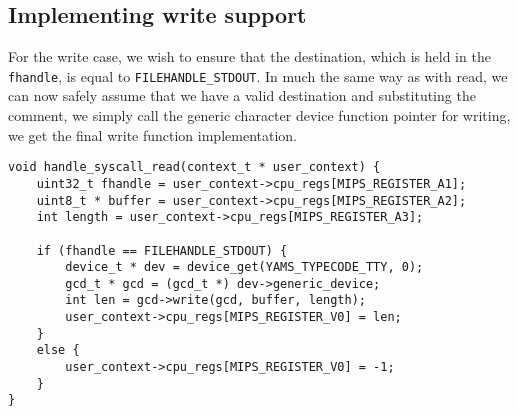 \documentclass[11pt]{article}
\newcommand{\code}[1]{{\tt #1}}
\begin{document}
\subsection{Implementing write support}
For the write case, we wish to ensure that the destination, which is held in
the \code{fhandle}, is equal to \code{FILEHANDLE\_STDOUT}. In much the same
way as with read, we can now safely assume that we have a valid destination
and substituting the comment, we simply call the generic character device
function pointer for writing, we get the final write function implementation.

\begin{lstlisting}
void handle_syscall_read(context_t * user_context) {
    uint32_t fhandle = user_context->cpu_regs[MIPS_REGISTER_A1];
    uint8_t * buffer = user_context->cpu_regs[MIPS_REGISTER_A2];
    int length = user_context->cpu_regs[MIPS_REGISTER_A3];

    if (fhandle == FILEHANDLE_STDOUT) {
        device_t * dev = device_get(YAMS_TYPECODE_TTY, 0);
        gcd_t * gcd = (gcd_t *) dev->generic_device;
        int len = gcd->write(gcd, buffer, length);
        user_context->cpu_regs[MIPS_REGISTER_V0] = len;
    }
    else {
        user_context->cpu_regs[MIPS_REGISTER_V0] = -1;
    }
}
\end{lstlisting}
\end{document}
